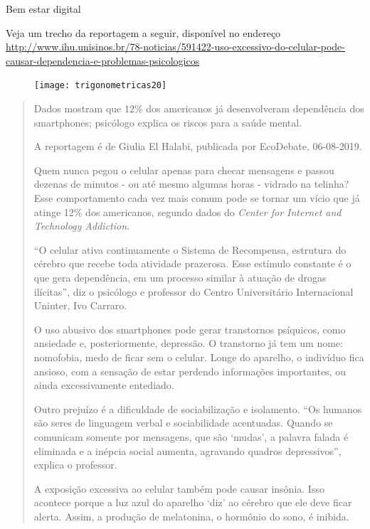 \clearpage
\begin{task}{Bem estar digital}
\label{trig-ativ6}


Veja um trecho da reportagem a seguir, disponível no endereço \url{http://www.ihu.unisinos.br/78-noticias/591422-uso-excessivo-do-celular-pode-causar-dependencia-e-problemas-psicologicos}


\begin{figure}[H]
\centering

\texttt{[image: trigonometricas20]}

\end{figure}

\begin{quote}

Dados mostram que $12\%$ dos americanos já desenvolveram dependência dos smartphones; psicólogo explica os riscos para a saúde mental.

A reportagem é de Giulia El Halabi, publicada por EcoDebate, 06-08-2019.


Quem nunca pegou o celular apenas para checar mensagens e passou dezenas de minutos - ou até mesmo algumas horas - vidrado na telinha? Esse comportamento cada vez mais comum pode se tornar um vício que já atinge 12\% dos americanos, segundo dados do \textit{Center for Internet and Technology Addiction}.

“O celular ativa continuamente o Sistema de Recompensa, estrutura do cérebro que recebe toda atividade prazerosa. Esse estímulo constante é o que gera dependência, em um processo similar à atuação de drogas ilícitas”, diz o psicólogo e professor do Centro Universitário Internacional Uninter, Ivo Carraro.

O uso abusivo dos smartphones pode gerar transtornos psíquicos, como ansiedade e, posteriormente, depressão. O transtorno já tem um nome: nomofobia, medo de ficar sem o celular. Longe do aparelho, o indivíduo fica ansioso, com a sensação de estar perdendo informações importantes, ou ainda excessivamente entediado.

Outro prejuízo é a dificuldade de sociabilização e isolamento. “Os humanos são seres de linguagem verbal e sociabilidade acentuadas. Quando se comunicam somente por mensagens, que são ‘mudas’, a palavra falada é eliminada e a inépcia social aumenta, agravando quadros depressivos”, explica o professor.

A exposição excessiva ao celular também pode causar insônia. Isso acontece porque a luz azul do aparelho ‘diz’ ao cérebro que ele deve ficar alerta. Assim, a produção de melatonina, o hormônio do sono, é inibida.


\end{quote}
\end{task}
